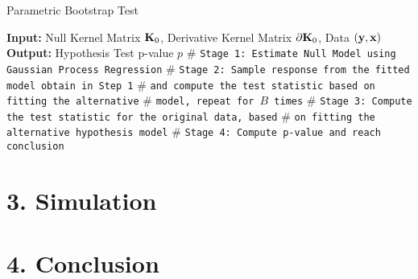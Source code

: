 \documentclass[11pt]{article}
\begin{document}
\begin{algorithm}
\caption{Parametric Bootstrap Test} 
\label{alg:cvek}
\begin{algorithmic}[1]
\newline
\textbf{Input:} Null Kernel Matrix ${\bf K}_0$, Derivative Kernel Matrix $\partial {\bf K}_0$, Data $({\bf y}, {\bf x})$\newline
\textbf{Output:} Hypothesis Test p-value $p$\newline
$\#$ \texttt{Stage 1: Estimate Null Model using Gaussian Process Regression}
\newline
$\#$ \texttt{Stage 2: Sample response from the fitted model obtain in Step 1}
\newline
$\#$ \texttt{and compute the test statistic based on fitting the alternative}
\newline
$\#$ \texttt{model, repeat for $B$ times}
\EndFor 
\newline
$\#$ \texttt{Stage 3: Compute the test statistic for the original data, based}
\newline
$\#$ \texttt{on fitting the alternative hypothesis model}
\newline
$\#$ \texttt{Stage 4: Compute p-value and reach conclusion}
\EndProcedure
\end{algorithmic}
\end{algorithm}


\section*{{\bf 3. Simulation}}
\section*{{\bf 4. Conclusion}}















\end{document}
